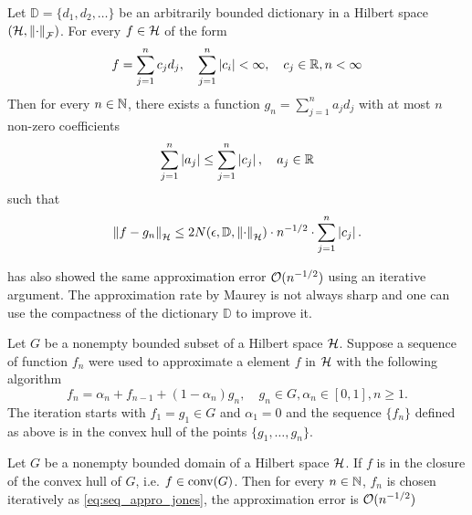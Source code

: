 \begin{theorem}
    \label{thm:maurey}
    Let $\mathbb{D} = \{d_1, d_2, \dots\}$ be an arbitrarily bounded dictionary
    in a Hilbert space $(\mathcal{H}, \left\| \cdot \right\|_{\mathcal{F}})$. For every $f \in
    \mathcal{H}$ of the form
    \begin{equation}
        f = \sum_{j=1}^n c_j d_j, \quad
        \sum_{j=1}^n \left| c_i \right| < \infty, \quad
        c_j \in \mathbb{R}, n < \infty
    \end{equation}
    Then for every $n \in \mathbb{N}$, there exists a function $g_n = \sum_{j=1}^n a_j
    d_j$ with at most $n$ non-zero coefficients
    \begin{equation}
        \sum_{j=1}^n \left| a_j \right| \leq
        \sum_{j=1}^n \left| c_j \right|, 
        \quad a_j \in \mathbb{R}
    \end{equation}
    such that
    \begin{equation}
        \left\| f - g_n \right\|_{\mathcal{H}} \leq
        2 N(\epsilon, \mathbb{D}, \left\| \cdot \right\|_{\mathcal{H}})
        \cdot n^{-1/2}
        \cdot \sum_{j=1}^n \left| c_j \right|.
    \end{equation}

\end{theorem}

\cite{jonesSimpleLemmaGreedy1992} has also showed the same approximation error
$\mathcal{O}(n^{-1/2})$ using an iterative argument. The approximation rate by Maurey
is not always sharp and one can use the compactness of the dictionary
$\mathbb{D}$ to improve it.

Let $G$ be a nonempty bounded subset of a Hilbert space $\mathcal{H}$. Suppose a
sequence of function $f_n$ were used to approximate a element $f$ in $\mathcal{H}$
with the following algorithm
\begin{equation}
    \label{eq:seq_appro_jones}
    f_n = \alpha_n + f_{n-1} + (1-\alpha_n) g_n, \quad
    g_n \in G, \alpha_n \in [0,1], n \geq 1.
\end{equation}
The iteration starts with $f_1 = g_1 \in G$ and $\alpha_1 = 0$ and the sequence
$\{f_n\}$ defined as above is in the convex hull of the points $\{g_1,\dots,
g_n\}$.

\begin{theorem}
    Let $G$ be a nonempty bounded domain of a Hilbert space $\mathcal{H}$. If $f$
    is in the closure of the convex hull of $G$, i.e. $f \in \textnormal{conv}(G)$. Then for
    every $n \in \mathbb{N}$, $f_n$ is chosen iteratively as
    \eqref{eq:seq_appro_jones}, the approximation error is $\mathcal{O}(n^{-1/2})$
\end{theorem}

